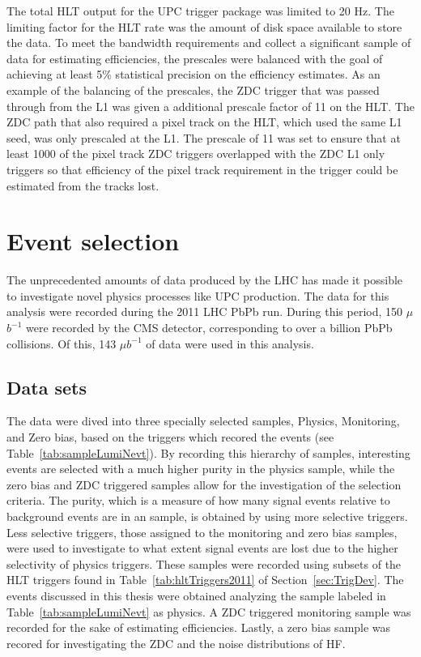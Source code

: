       The total HLT output for the UPC trigger package was limited to 20 Hz. 
      The limiting factor for the HLT rate was the amount of disk space 
        available to store the data. 
      To meet the bandwidth requirements and collect a significant sample
        of data for estimating efficiencies, the prescales were balanced with 
        the goal of achieving at least 5\% statistical precision on the 
        efficiency estimates. 
      As an example of the balancing of the prescales, the  ZDC trigger that 
        was passed through from the L1 was given a additional prescale factor 
        of 11 on the HLT.
      The ZDC path that also required a pixel track on the HLT, which used 
        the same L1 seed, was only prescaled at the L1.
      The prescale of 11 was set to ensure that at least 1000 of the pixel track 
        ZDC triggers overlapped with the ZDC L1 only triggers so that efficiency
        of the pixel track requirement in the trigger could be estimated from 
        the tracks lost. 

  \section{\label{sec:DataSetEvSel} Event selection}
    The unprecedented amounts of data produced by the LHC has made it possible 
      to investigate novel physics processes like UPC \JPsi{} production.
    The data for this analysis were recorded during the 2011 LHC PbPb run. 
    During this period, 150 $\mu$$b^{-1}$ were recorded by the CMS detector,
      corresponding to over a billion PbPb collisions. 
    Of this, 143 $\mu$$b^{-1}$ of data were used in this analysis.
  
    \subsection{Data sets}
      The data were dived into three specially selected samples, Physics, Monitoring, 
        and Zero bias, based on the triggers which recored the events (see 
        Table~\ref{tab:sampleLumiNevt}).
      By recording this hierarchy of samples, interesting events are selected 
        with a much higher purity in the physics sample, while the zero bias 
        and ZDC triggered samples allow for the investigation of the selection 
        criteria. 
      The purity, which is a measure of how many signal events relative to
        background events are in an sample, is obtained by using more selective
        triggers.
      Less selective triggers, those assigned to the monitoring and zero bias 
        samples, were used to investigate to what extent signal events are lost
        due to the higher selectivity of physics triggers. 
      These samples were recorded using subsets of the HLT triggers found in 
        Table~\ref{tab:hltTriggers2011} of Section~\ref{sec:TrigDev}.
      The \JPsi{} events discussed in this thesis were obtained analyzing the 
        sample labeled in Table~\ref{tab:sampleLumiNevt} as physics.
      A ZDC triggered monitoring sample was recorded for the sake of estimating
        efficiencies.
      Lastly, a zero bias sample was recored for investigating the ZDC and the 
        noise distributions of HF.
  
